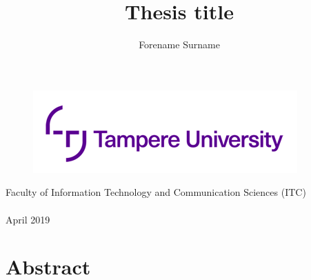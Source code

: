 \documentclass[12pt,a4paper,english
]{tunithesis}
\author{Forename Surname}
\title{Thesis title} %
\begin{document}
\makeatletter



%
\thispagestyle{empty}
\vspace*{-.5cm}\noindent

\begin{figure}
    \vspace{-1.3cm}
    \advance\leftskip-2.5cm
    \noindent\includegraphics{img/tunilogo.png}
\end{figure}
 
\vspace{2.5cm}
\begin{flushright}
\noindent\textsf{\LARGE{\@author}}

\noindent\vspace{0.5cm}

\noindent\Huge{\textsf{\textbf{\textcolor{tunipurple}{\@title}}}}
\end{flushright}
\vspace{13.7cm} %

\begin{flushright}  
    \begin{spacing}{1.0}
      \textsf{Faculty of Information Technology and Communication Sciences (ITC)\\
      \@thesistype\\
      April 2019}
    \end{spacing}
\end{flushright}

\if@twoside
\clearpage
\fi




\chapter*{Abstract}
\end{document}
